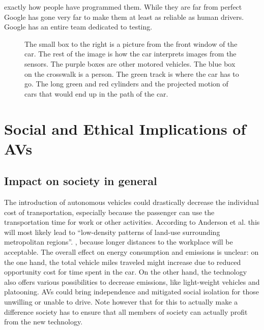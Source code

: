 \documentclass[11pt]{article}
\begin{document}
exactly how people have programmed them. While they are far from perfect Google has gone very far to make them at least as
reliable as human drivers. Google has an entire team dedicated to testing. 
\begin{figure}[!ht]
  \centering
                  \caption{The small box to the right is a picture from the front window of the car. The rest of the
                      image is how the car interprets images from the sensors. The purple boxes are other motored
                          vehicles. The blue box on the crosswalk is a person. The green track is where the car has to
                          go. The long green and red cylinders and the projected motion of cars that would end up in the
                  path of the car.}
\end{figure}

\par


\section{Social and Ethical Implications of AVs}
\subsection{Impact on society in general}
The introduction of autonomous vehicles could drastically decrease the individual cost of transportation, especially because the passenger can use the transportation time for work or other activities. According to Anderson et al. this will most likely lead to ``low-density patterns of land-use surrounding metropolitan regions''. \cite{Anderson2014rand}, because longer distances to the workplace will be acceptable.
The overall effect on energy consumption and emissions is unclear: on the one hand, the total vehicle miles traveled might increase due to reduced opportunity cost for time spent in the car. On the other hand, the technology also offers various possibilities to decrease emissions, like light-weight vehicles and platooning.
AVs could bring independence and mitigated social isolation for those unwilling or unable to drive. Note however that for this to actually make a difference society has to ensure that all members of society can actually profit from the new technology.
\end{document}
